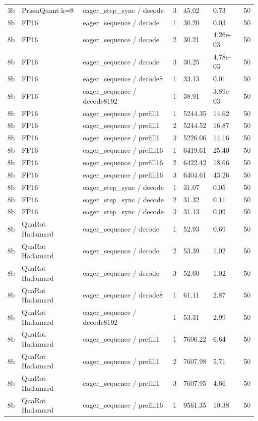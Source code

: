 {\begin{longtable}{lllllll}
3b & PrismQuant k=8 & eager\_step\_sync / decode & 3 & 45.02 & 0.73 & 50 \\
8b & FP16 & eager\_sequence / decode & 1 & 30.20 & 0.03 & 50 \\
8b & FP16 & eager\_sequence / decode & 2 & 30.21 & 4.26e-03 & 50 \\
8b & FP16 & eager\_sequence / decode & 3 & 30.25 & 4.78e-03 & 50 \\
8b & FP16 & eager\_sequence / decode8 & 1 & 33.13 & 0.01 & 50 \\
8b & FP16 & eager\_sequence / decode8192 & 1 & 38.91 & 3.89e-03 & 50 \\
8b & FP16 & eager\_sequence / prefill1 & 1 & 5244.35 & 14.62 & 50 \\
8b & FP16 & eager\_sequence / prefill1 & 2 & 5244.52 & 16.87 & 50 \\
8b & FP16 & eager\_sequence / prefill1 & 3 & 5226.06 & 14.16 & 50 \\
8b & FP16 & eager\_sequence / prefill16 & 1 & 6419.61 & 25.40 & 50 \\
8b & FP16 & eager\_sequence / prefill16 & 2 & 6422.42 & 18.66 & 50 \\
8b & FP16 & eager\_sequence / prefill16 & 3 & 6404.61 & 43.26 & 50 \\
8b & FP16 & eager\_step\_sync / decode & 1 & 31.07 & 0.05 & 50 \\
8b & FP16 & eager\_step\_sync / decode & 2 & 31.32 & 0.11 & 50 \\
8b & FP16 & eager\_step\_sync / decode & 3 & 31.13 & 0.09 & 50 \\
8b & QuaRot Hadamard & eager\_sequence / decode & 1 & 52.93 & 0.69 & 50 \\
8b & QuaRot Hadamard & eager\_sequence / decode & 2 & 53.39 & 1.02 & 50 \\
8b & QuaRot Hadamard & eager\_sequence / decode & 3 & 52.60 & 1.02 & 50 \\
8b & QuaRot Hadamard & eager\_sequence / decode8 & 1 & 61.11 & 2.87 & 50 \\
8b & QuaRot Hadamard & eager\_sequence / decode8192 & 1 & 53.31 & 2.99 & 50 \\
8b & QuaRot Hadamard & eager\_sequence / prefill1 & 1 & 7606.22 & 6.64 & 50 \\
8b & QuaRot Hadamard & eager\_sequence / prefill1 & 2 & 7607.98 & 5.71 & 50 \\
8b & QuaRot Hadamard & eager\_sequence / prefill1 & 3 & 7607.95 & 4.66 & 50 \\
8b & QuaRot Hadamard & eager\_sequence / prefill16 & 1 & 9561.35 & 10.38 & 50 \\

\end{longtable}}
